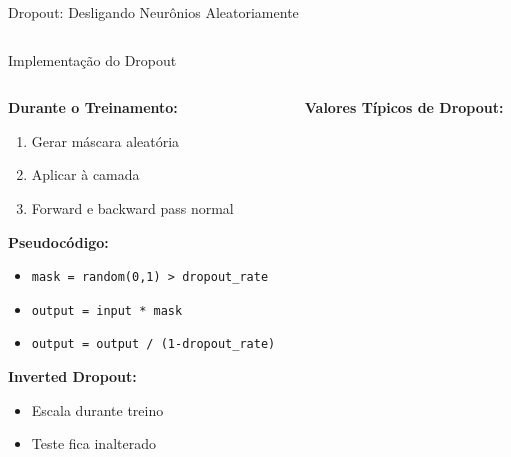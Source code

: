\documentclass[xcolor=dvipsnames,t,aspectratio=169]{beamer}
\begin{document}
\begin{frame}[c]{Dropout: Desligando Neurônios Aleatoriamente}
\begin{columns}[c]
\begin{column}{0.45\textwidth}
        \end{column}
    \end{columns}
\end{frame}

\begin{frame}[c]{Implementação do Dropout}
    \begin{columns}[c]
        \begin{column}{0.5\textwidth}
            \textbf{Durante o Treinamento:}
            \begin{enumerate}
                \item Gerar máscara aleatória
                \item Aplicar à camada
                \item Forward e backward pass normal
            \end{enumerate}
            
            \vspace{0.3cm}
            \textbf{Pseudocódigo:}
            \begin{itemize}
                \item[] \texttt{mask = random(0,1) > dropout\_rate}
                \item[] \texttt{output = input * mask}
                \item[] \texttt{output = output / (1-dropout\_rate)}
            \end{itemize}
            
            \vspace{0.3cm}
            \textbf{Inverted Dropout:}
            \begin{itemize}
                \item Escala durante treino
                \item Teste fica inalterado
            \end{itemize}
        \end{column}
        \begin{column}{0.5\textwidth}
            \textbf{Valores Típicos de Dropout:}
            

\end{column}
\end{columns}
\end{frame}
\end{document}
